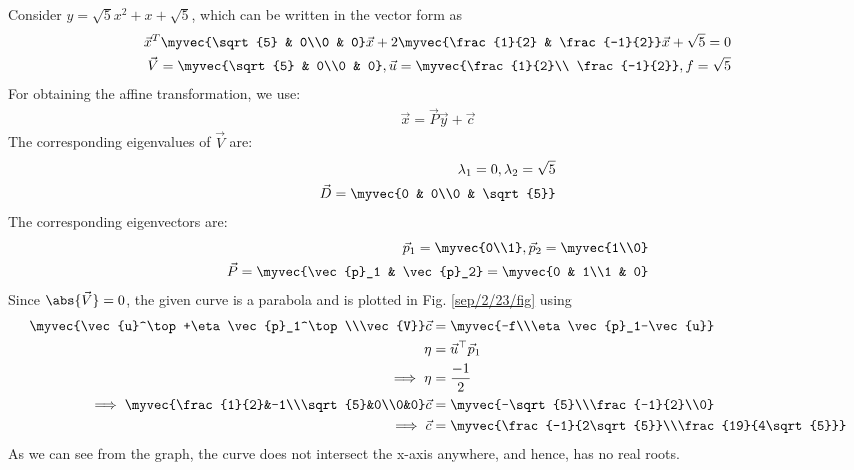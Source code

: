 Consider $y = \sqrt{5}x^2 + x + \sqrt{5}$, which can be written in the vector form as
%
\begin{align}
\vec{x}^T \myvec{\sqrt{5} & 0\\0 & 0}\vec{x} + 2\myvec{\frac{1}{2} & \frac{-1}{2}}\vec{x} + \sqrt{5} = 0\\
\vec{V} = \myvec{\sqrt{5} & 0\\0 & 0} , \vec{u} = \myvec{\frac{1}{2}\\ \frac{-1}{2}} , f = \sqrt{5}
\end{align}
%
For obtaining the affine transformation, we use:
\begin{align}
    \vec{x} = \vec{P}\vec{y} + \vec{c}
\end{align}
The corresponding eigenvalues of $\vec{V}$ are:
\begin{align}
    \lambda_1 = 0 , \lambda_2 = \sqrt{5}\\
    \vec{D} = \myvec{0 & 0\\0 & \sqrt{5}}
\end{align}
The corresponding eigenvectors are:
\begin{align}
    \vec{p}_1 = \myvec{0\\1} , \vec{p}_2 = \myvec{1\\0}\\
    \vec{P} = \myvec{\vec{p}_1 & \vec{p}_2} = \myvec{0 & 1\\1 & 0}
\end{align}
%
Since $\abs{\vec{V}} = 0$, the given curve is a parabola and is plotted in Fig. \ref{sep/2/23/fig} using
\begin{align}
    \myvec{\vec{u}^\top+\eta \vec{p}_1^\top\\\vec{V}}\vec{c} &= \myvec{-f\\\eta \vec{p}_1-\vec{u}}\\
    \eta &= \vec{u}^\top \vec{p}_1\\
    \implies \eta &= \frac{-1}{2}\\
    \implies \myvec{\frac{1}{2}&-1\\\sqrt{5}&0\\0&0}\vec{c} &= \myvec{-\sqrt{5}\\\frac{-1}{2}\\0}\\
    \implies \vec{c} &= \myvec{\frac{-1}{2\sqrt{5}}\\\frac{19}{4\sqrt{5}}}
\end{align}
As we can see from the graph, the curve does not intersect the x-axis anywhere, and hence, has no real roots.

